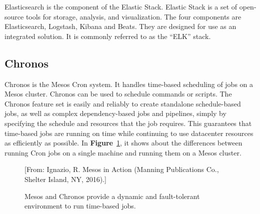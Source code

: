 \documentclass[12pt,oneside,openright,a4paper]{cpe-english-project}
\begin{document}
\hspace{10mm}Elasticsearch is the component of the Elastic Stack. Elastic Stack is a set of open-source tools for storage, analysis, and visualization. The four components are Elasticsearch, Logstash, Kibana and Beats. They are designed for use as an integrated solution. It is commonly referred to as the “ELK” stack.\cite{elasticsearch}

\subsection{Chronos}
\hspace{10mm}Chronos is the Mesos Cron system. It handles time-based scheduling of jobs on a Mesos cluster. Chronos can be used to schedule commands or scripts. The Chronos feature set is easily and reliably to create standalone schedule-based jobs, as well as complex dependency-based jobs and pipelines, simply by specifying the schedule and resources that the job requires. This guarantees that time-based jobs are running on time while continuing to use datacenter resources as efficiently as possible. In \textbf{Figure}~\ref{fig:chronos}, it shows about the differences between running Cron jobs on a single machine and running them on a Mesos cluster.\cite{mesosInAction}

\begin{figure}[!h]\centering
  \setlength{\fboxrule}{0mm} %
  \setlength{\fboxsep}{0cm}
  \caption{Mesos and Chronos provide a dynamic and fault-tolerant environment to run time-based jobs.}\label{fig:chronos}
  [From: Ignazio, R. Mesos in Action (Manning Publications Co., Shelter Island, NY, 2016).]
\end{figure}
\end{document}
